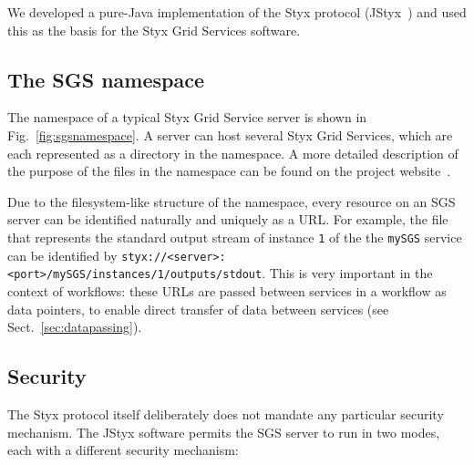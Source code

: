 \documentclass[a4paper]{article}
\begin{document}
We developed a pure-Java implementation of the Styx protocol (JStyx~\cite{JStyx}) and used this as the basis for the Styx Grid Services software.  

\subsection{The SGS namespace}\label{sec:sgsnamespace}
The namespace of a typical Styx Grid Service server is shown in Fig.~\ref{fig:sgsnamespace}.  A server can host several Styx Grid Services, which are each represented as a directory in the namespace.  A more detailed description of the purpose of the files in the namespace can be found on the project website~\cite{sgswebsite}.


Due to the filesystem-like structure of the namespace, every resource on an SGS server can be identified naturally and uniquely as a URL.  For example, the file that represents the standard output stream of instance \texttt{1} of the the \texttt{mySGS} service can be identified by \texttt{styx://<server>:<port>/mySGS/instances/1/outputs/stdout}.  This is very important in the context of workflows: these URLs are passed between services in a workflow as data pointers, to enable direct transfer of data between services (see Sect.~\ref{sec:datapassing}).

\subsection{Security}\label{sec:security}
The Styx protocol itself deliberately does not mandate any particular security mechanism.  The JStyx software permits the SGS server to run in two modes, each with a different security mechanism:
\end{document}
